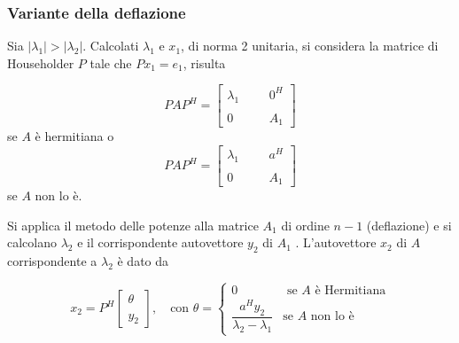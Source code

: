 




\subsubsection{Variante della deflazione}
Sia $|\lambda_1 | > |\lambda_2 |$. Calcolati $\lambda_1$ e $x_1$, di norma 2
unitaria, si considera la matrice di Householder $P$ tale che
$ Px_1 = e_1 $, risulta

$$
PAP^{H} =
\left[
  \begin{array}{llll}
    \lambda_1 &  &  & 0^{H} \\
              &  &  &       \\
    0         &  &  & A_1
  \end{array}
\right]
$$
se $A$ \`e hermitiana o
$$
PAP^{H} =
\left[
  \begin{array}{llll}
    \lambda_1 &  &  & a^{H} \\
              &  &  &       \\
    0         &  &  & A_1
  \end{array}
\right]
$$
se $A$ non lo \`e.

Si applica il metodo delle potenze alla matrice $A_1$ di ordine $n -
1$ (deflazione) e si calcolano $\lambda_2$ e il corrispondente
autovettore $y_2$ di $A_1$ .  L'autovettore $x_2$ di $A$
corrispondente a $\lambda_2$ \`e dato da

$$
x_2 = P^{H}
\left[
  \begin{array}{l}
    \theta \\
    \\
    y_2
  \end{array}
\right]
,
\quad
\text{con } \theta=\left\{
  \begin{array}{ll}
    0 & \text{ se } A \text{ \`e Hermitiana} \\
    \dfrac{a^{H}y_2}{\lambda_2 - \lambda_1} & \text{se } A \text{ non lo \`e}
  \end{array}
\right.
$$

